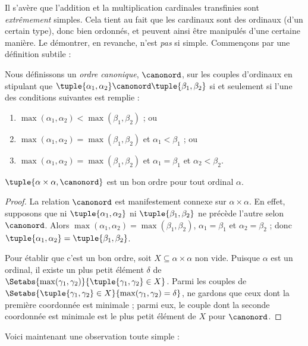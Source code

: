\documentclass[../../../include/open-logic-section]{subfiles}
\begin{document}


Il s'avère que l'addition et la multiplication
cardinales transfinies sont \emph{extrêmement}
simples. Cela tient au fait que les cardinaux sont
des ordinaux (d'un certain type), donc bien ordonnés,
et peuvent ainsi être manipulés d'une certaine manière.
Le démontrer, en revanche, n'est \emph{pas} si simple.
Commençons par une définition subtile :

\begin{defn}
Nous définissons un \emph{ordre canonique},
$\canonord$, sur les couples d'ordinaux en stipulant
que $\tuple{\alpha_1, \alpha_2} \canonord
\tuple{\beta_1, \beta_2}$ si et seulement si
l'une des conditions suivantes est remplie :
\begin{enumerate}
	\item $\max(\alpha_1, \alpha_2) < \max(\beta_1, \beta_2)$ ; ou
	\item $\max(\alpha_1, \alpha_2) = \max(\beta_1, \beta_2)$
	et $\alpha_1 < \beta_1$ ; ou
	\item $\max(\alpha_1, \alpha_2) = \max(\beta_1, \beta_2)$
	et $\alpha_1 = \beta_1$ et $\alpha_2 < \beta_2$.
\end{enumerate}
\end{defn}

\begin{lem}
$\tuple{\alpha \times \alpha, \canonord}$ est un
bon ordre pour tout ordinal $\alpha$.
\end{lem}

\begin{proof}
La relation $\canonord$ est manifestement connexe
sur $\alpha \times \alpha$. En effet, supposons
que ni $\tuple{\alpha_1, \alpha_2}$ ni
$\tuple{\beta_1, \beta_2}$ ne précède l'autre
selon $\canonord$. Alors
$\max(\alpha_1, \alpha_2) = \max(\beta_1, \beta_2)$,
$\alpha_1 = \beta_1$ et
$\alpha_2 = \beta_2$ ; donc
$\tuple{\alpha_1, \alpha_2} =
\tuple{\beta_1, \beta_2}$.

Pour établir que c'est un bon ordre, soit
$X \subseteq \alpha\times\alpha$ non vide.
Puisque $\alpha$ est un ordinal, il existe un plus
petit élément $\delta$ de
$\Setabs{\max(\gamma_1, \gamma_2)}
{\tuple{\gamma_1, \gamma_2} \in X}$.
Parmi les couples de
$\Setabs{\tuple{\gamma_1,\gamma_2} \in X}
{\max(\gamma_1, \gamma_2) = \delta}$,
ne gardons que ceux dont la première coordonnée
est minimale ; parmi eux, le couple dont la seconde
coordonnée est minimale est le plus petit élément
de $X$ pour $\canonord$.
\end{proof}
\noindent
Voici maintenant une observation toute simple :
\end{document}
